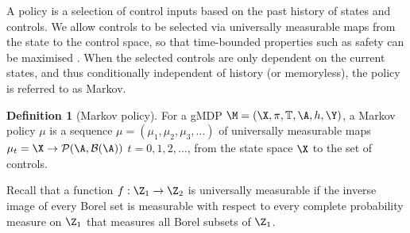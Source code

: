 \documentclass[letterpaper, 10 pt, conference]{amsart}
\theoremstyle{definition}
\newtheorem{defn}[definition]{Definition}
\theoremstyle{example}
\theoremstyle{remark}
\begin{document}
A policy is a selection of control inputs based on the past history of states and controls. 
We allow controls to be selected via universally measurable maps \cite{bible} from the state to the control space, 
so that time-bounded properties such as safety can be maximised \cite{Abate1}. 
When the selected controls are only dependent on the current states, 
and thus conditionally independent of history (or memoryless), 
the policy is referred to as Markov. 
\begin{defn}[Markov policy]\label{def:markovpolicy}
For a gMDP $\M=(\X,\pi,\mathbb T,\A, h, \Y)$, a Markov policy $\mu$ is a sequence $\mu=(\mu_1,\mu_2,\mu_3,\ldots)$ of universally measurable maps $\mu_t=\X\rightarrow \mathcal P(\A,\mathcal B(\A))$ $t=0,1,2,\ldots$, from the state space $\X$ to the set of controls.
\end{defn}
Recall that a function $f:\Z_1\rightarrow \Z_2$ is universally measurable  if the inverse image of every Borel set is measurable with respect to every complete probability measure on $\Z_1$ that measures all Borel subsets of $\Z_1$. 
\end{document}
